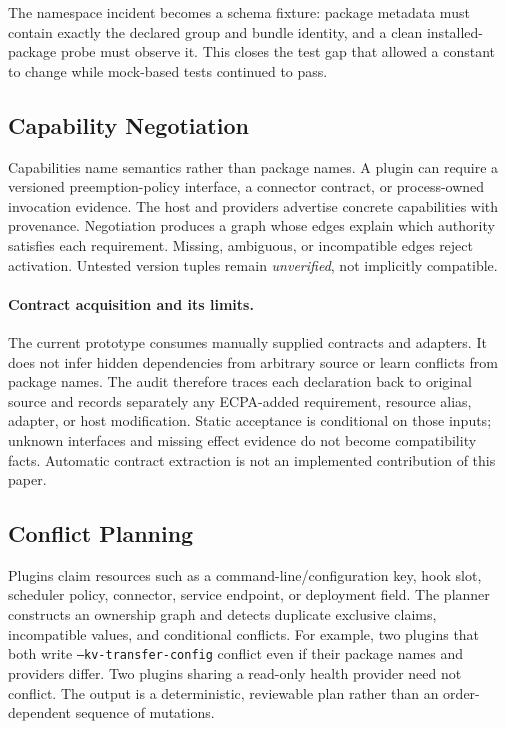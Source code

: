 \documentclass[letterpaper,twocolumn,10pt]{article}
\newcommand{\code}[1]{\texttt{#1}}
\begin{document}
The namespace incident becomes a schema fixture: package metadata must contain
exactly the declared group and bundle identity, and a clean installed-package
probe must observe it.  This closes the test gap that allowed a constant to
change while mock-based tests continued to pass.

\subsection{Capability Negotiation}
Capabilities name semantics rather than package names.  A plugin can require a
versioned preemption-policy interface, a connector contract, or process-owned
invocation evidence.  The host and providers advertise concrete capabilities
with provenance.  Negotiation produces a graph whose edges explain which
authority satisfies each requirement.  Missing, ambiguous, or incompatible
edges reject activation.  Untested version tuples remain \emph{unverified}, not
implicitly compatible.

\paragraph{Contract acquisition and its limits.}
The current prototype consumes manually supplied contracts and adapters.
It does not infer hidden dependencies from arbitrary source or learn
conflicts from package names. The audit therefore traces each declaration
back to original source and records separately any ECPA-added requirement,
resource alias, adapter, or host modification. Static acceptance is conditional
on those inputs; unknown interfaces and missing effect evidence do not become
compatibility facts. Automatic contract extraction is not an implemented
contribution of this paper.

\subsection{Conflict Planning}
Plugins claim resources such as a command-line/configuration key, hook slot,
scheduler policy, connector, service endpoint, or deployment field.  The
planner constructs an ownership graph and detects duplicate exclusive claims,
incompatible values, and conditional conflicts.  For example, two plugins that
both write \code{--kv-transfer-config} conflict even if their package names and
providers differ.  Two plugins sharing a read-only health provider need not
conflict.  The output is a deterministic, reviewable plan rather than an
order-dependent sequence of mutations.
\end{document}
